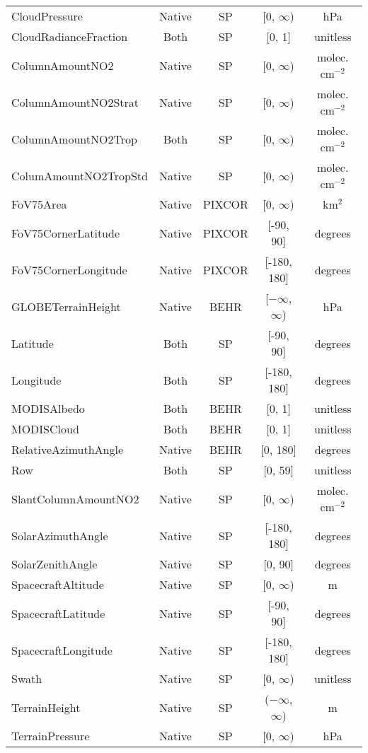 \documentclass[12pt]{article}
\begin{document}
\begin{center}
\begin{longtable}{lcccc}
	CloudPressure		&	Native	 	&	SP			& 	[0, $\infty$) & hPa \\
	CloudRadianceFraction &	Both 		&	SP			&	[0, 1]	& unitless \\
	ColumnAmountNO2		&	Native	 	&	SP			&	[0, $\infty$) & molec. cm$^{-2}$ \\
	ColumnAmountNO2Strat &	Native 		&	SP			& 	[0, $\infty$) & molec. cm$^{-2}$ \\
	ColumnAmountNO2Trop 	&	Both		 	&	SP			&	[0, $\infty$) & molec. cm$^{-2}$ \\
	ColumAmountNO2TropStd &	Native 		& 	SP			&	[0, $\infty$) & molec. cm$^{-2}$ \\
	FoV75Area			& 	Native		& 	PIXCOR		&	[0, $\infty$)	&km$^2$ \\
	FoV75CornerLatitude	&	Native		&	PIXCOR		&	[-90, 90]	& degrees \\
	FoV75CornerLongitude &	Native		&	PIXCOR		&	[-180, 180] 	& degrees \\
	GLOBETerrainHeight	&	Native	 	&	BEHR			&	[$-\infty$, $\infty$) & hPa \\
	Latitude				& 	Both 		&	SP			&	[-90, 90] & degrees \\
	Longitude			& 	Both 		& 	SP			&	[-180, 180] & degrees \\
	MODISAlbedo			&	Both		 	&	BEHR			&	[0, 1]	 & unitless \\
	MODISCloud			&	Both 		&	BEHR			&	[0, 1]	 & unitless \\
	RelativeAzimuthAngle &	Native	 	&	BEHR			&	[0, 180] & degrees \\
	Row					&	Both 		&	SP			&   [0, 59]	& unitless \\
	SlantColumnAmountNO2 & 	Native	 	&	SP			& 	[0, $\infty$) & molec. cm$^{-2}$ \\
	SolarAzimuthAngle	&	Native	 	&	SP			&	[-180, 180] & degrees \\
	SolarZenithAngle		&	Native	 	&	SP			&	[0, 90]		& degrees \\
	SpacecraftAltitude	&	Native		&	SP			&	[0, $\infty$)	& m \\
	SpacecraftLatitude	&	Native		&	SP			&	[-90, 90]	& degrees \\
	SpacecraftLongitude	&	Native		&	SP			&	[-180, 180]	& degrees \\
	Swath				&	Native	 	&	SP			&	[0, $\infty$)	& unitless \\
	TerrainHeight		&	Native	 	& 	SP			&	($-\infty$, $\infty$) 	& m \\
	TerrainPressure		&	Native	 	& 	SP			&	[0, $\infty$) 	& hPa \\

\end{longtable}
\end{center}
\end{document}
